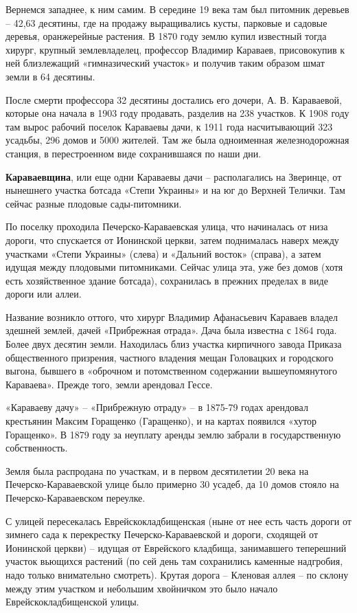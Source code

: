 Вернемся западнее, к ним самим. В середине 19 века там был питомник деревьев – 42,63 десятины, где на продажу выращивались кусты, парковые и садовые деревья, оранжерейные растения. В 1870 году землю купил известный тогда хирург, крупный землевладелец, профессор Владимир Караваев, присовокупив к ней близлежащий «гимназический участок» и получив таким образом шмат земли в 64 десятины. 

После смерти профессора 32 десятины достались его дочери, А. В. Караваевой, которые она начала в 1903 году продавать, разделив на 238 участков. К 1908 году там вырос рабочий поселок Караваевы дачи, к 1911 года насчитывающий 323 усадьбы, 296 домов и 5000 жителей. Там же была одноименная железнодорожная станция, в перестроенном виде сохранившаяся по наши дни.\\ 

\medskip


\textbf{Караваевщина}, или еще одни Караваевы дачи – располагались на Зверинце, от нынешнего участка ботсада «Степи Украины» и на юг до Верхней Телички. Там сейчас разные плодовые сады-питомники. 

По поселку проходила Печерско-Караваевс\-кая улица, что начиналась от низа дороги, что спускается от Ионинской церкви, затем поднималась наверх между участками «Степи Украины» (слева) и «Дальний восток» (справа), а затем идущая между плодовыми питомниками. Сейчас улица эта, уже без домов (хотя есть хозяйственное здание ботсада), сохранилась в прежних пределах в виде дороги или аллеи.

Название возникло оттого, что хирург Владимир Афанасьевич Караваев владел здешней землей, дачей «Прибрежная отрада». Дача была известна с 1864 года. Более двух десятин земли. Находилась близ участка кирпичного завода Приказа общественного призрения, частного владения мещан Головацких и городского выгона, бывшего в «оброчном и потомственном содержании вышеупомянутого Караваева». Прежде того, земли арендовал Гессе.
 
«Караваеву дачу» – «Прибрежную отраду» – в 1875-79 годах арендовал крестьянин Максим Горащенко (Гаращенко), и на картах появился «хутор Горащенко». В 1879 году за неуплату аренды землю забрали в государственную собственность.

Земля была распродана по участкам, и в первом десятилетии 20 века на Печерско-Карава\-евской улице было примерно 30 усадеб, да 10 домов стояло на Печерско-Карава\-евском переулке.

С улицей пересекалась Еврейскокладбищенская (ныне от нее есть часть дороги от зимнего сада к перекрестку Печерско-Караваевской и дороги, сходящей от Ионинской церкви) – идущая от Еврейского кладбища, занимавшего теперешний участок вьющихся растений (по сей день там сохранились каменные надгробия, надо только внимательно смотреть). Крутая дорога – Кленовая аллея – по склону между этим участком и небольшим хвойничком это было начало Еврейскокладбищенской улицы.\\

